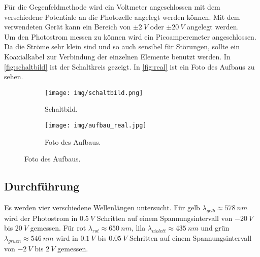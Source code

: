 Für die Gegenfeldmethode wird ein Voltmeter angeschlossen mit dem verschiedene Potentiale an die Photozelle angelegt werden können. Mit dem verwendeten Gerät kann ein Bereich von
$\pm \SI{2}{V}$ oder $\pm \SI{20}{V}$ angelegt werden.\\
Um den Photostrom messen zu können wird ein Picoamperemeter angeschlossen. Da die Ströme sehr klein sind und so auch sensibel für Störungen, sollte ein Koaxialkabel zur Verbindung
der einzelnen Elemente benutzt werden. In \autoref{fig:schaltbild} ist der Schaltkreis gezeigt. In \autoref{fig:real} ist ein Foto des Aufbaus zu sehen.
\begin{figure}[H]
    \centering
    \begin{subfigure}[b]{0.49\textwidth}
        \centering
        \texttt{[image: img/schaltbild.png]}
        \caption[]
        {{\small Schaltbild.}}    
        \label{fig:schaltbild}
    \end{subfigure}
    \hfill
    \begin{subfigure}[b]{0.49\textwidth}  
        \centering 
        \texttt{[image: img/aufbau\_real.jpg]}
        \caption[]
        {{\small Foto des Aufbaus.}}    
        \label{fig:real}
    \end{subfigure}
\end{figure}

\subsection{Durchführung}
Es werden vier verschiedene Wellenlängen untersucht. Für gelb $\lambda_{gelb} \approx \SI{578}{nm}$ wird der Photostrom in $\SI{0.5}{V}$ Schritten auf einem Spannungsintervall
von $\SI{-20}{V}$ bis $\SI{20}{V}$ gemessen. Für rot $\lambda_{rot} \approx \SI{650}{nm}$, lila $\lambda_{violett} \approx \SI{435}{nm}$ und grün $\lambda_{gruen} \approx \SI{546}{nm}$
wird in $\SI{0.1}{V}$ bis $\SI{0.05}{V}$ Schritten auf einem Spannungsintervall von $\SI{-2}{V}$ bis $\SI{2}{V}$ gemessen.